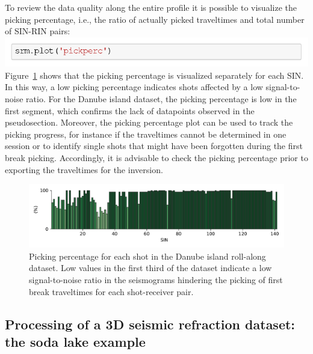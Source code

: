 \documentclass[a4paper,fleqn]{cas-sc}
\begin{document}
To review the data quality along the entire profile it is possible to visualize the picking percentage, i.e., the ratio of actually picked traveltimes and total number of SIN-RIN pairs:
\newline
\includegraphics[width=.5\textwidth]{./figures/plot_pickperc_danube.pdf}
\newline
Figure~\ref{fig:rollalong_pickperc} shows that the picking percentage is visualized separately for each SIN. In this way, a low picking percentage indicates shots affected by a low signal-to-noise ratio. For the Danube island dataset, the picking percentage is low in the first segment, which confirms the lack of datapoints observed in the pseudosection. Moreover, the picking percentage plot can be used to track the picking progress, for instance
if the traveltimes cannot be determined in one session or 
to identify single shots that might have been forgotten during the first break picking. Accordingly, it is advisable to check the picking percentage prior to exporting the traveltimes for the inversion.

\begin{figure}
	\centering
	\includegraphics[width=.75\textwidth]{figures/rollalong_pickperc.pdf}
	\caption{Picking percentage for each shot in the Danube island roll-along dataset. Low values in the first third of the dataset indicate a low signal-to-noise ratio in the seismograms hindering the picking of first break traveltimes for each shot-receiver pair.}
	\label{fig:rollalong_pickperc}
\end{figure}
\subsection{Processing of a 3D seismic refraction dataset: the soda lake example}
\end{document}

